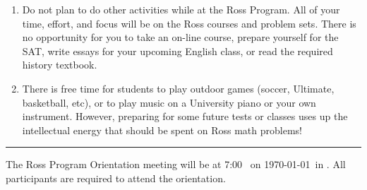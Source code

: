 \documentclass[11pt]{ross}
\begin{document}
\begin{enumerate}[label=(\arabic*),itemsep=2em,topsep=-1em]
\begin{enumerate}[label=(\alph*),itemsep=0.5em,topsep=0em]
  \item Do not plan to do other activities while at the Ross Program. All of 
    your time, effort, and focus will be on the Ross courses and problem 
    sets.  There is no opportunity for you to take an on-line course, 
    prepare yourself for the SAT, write essays for your upcoming English 
    class, or read the required history textbook.
  \item There is free time for students to play outdoor games (soccer, Ultimate, 
    basketball, etc), or to play music on a University piano or your own 
    instrument.   However, preparing for some future tests or classes uses up 
    the intellectual energy that should be spent on Ross math problems!
\end{enumerate}
\end{enumerate}

\vspace*{10mm}\hrule
The Ross Program Orientation meeting will be at 7:00 \peem\ on
\startsunday\today\ in \orientationlocation.  All participants are
required to attend the orientation.
\end{document}
